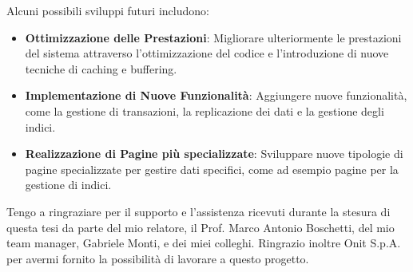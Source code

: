 \documentclass[12pt,a4paper,openright,twoside]{book}
\begin{document}
        Alcuni possibili sviluppi futuri includono:

        \begin{itemize}
            \item \textbf{Ottimizzazione delle Prestazioni}: Migliorare ulteriormente le prestazioni del sistema attraverso l'ottimizzazione del codice e l'introduzione di nuove tecniche di caching e buffering.
            \item \textbf{Implementazione di Nuove Funzionalità}: Aggiungere nuove funzionalità, come la gestione di transazioni, la replicazione dei dati e la gestione degli indici.
            \item \textbf{Realizzazione di Pagine più specializzate}: Sviluppare nuove tipologie di pagine specializzate per gestire dati specifici, come ad esempio pagine per la gestione di indici.
        \end{itemize}


\backmatter

\nocite{*} %




\begin{acknowledgements}
    Tengo a ringraziare per il supporto e l'assistenza ricevuti durante la stesura di questa tesi da parte del mio relatore, il Prof. Marco Antonio Boschetti, del mio team manager, Gabriele Monti, e dei miei colleghi.
    Ringrazio inoltre Onit S.p.A. per avermi fornito la possibilità di lavorare a questo progetto.
\end{acknowledgements}
\end{document}
